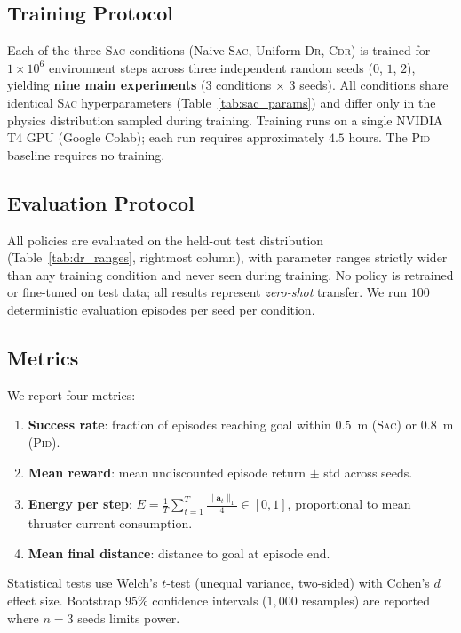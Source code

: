 \documentclass[letterpaper,10pt,journal]{IEEEtran}
\newcommand{\CDR}{\textsc{Cdr}\xspace}
\newcommand{\SAC}{\textsc{Sac}\xspace}
\newcommand{\PID}{\textsc{Pid}\xspace}
\newcommand{\DR}{\textsc{Dr}\xspace}
\begin{document}
\subsection{Training Protocol}

Each of the three \SAC conditions (Naive \SAC, Uniform \DR, \CDR) is
trained for $1\!\times\!10^6$ environment steps across three independent
random seeds ($0$, $1$, $2$), yielding \textbf{nine main experiments}
($3$ conditions $\times$ $3$ seeds).
All conditions share identical \SAC hyperparameters (Table~\ref{tab:sac_params})
and differ only in the physics distribution sampled during training.
Training runs on a single NVIDIA T4 GPU (Google Colab); each run requires
approximately $4.5$ hours.
The \PID baseline requires no training.

\subsection{Evaluation Protocol}

All policies are evaluated on the held-out test distribution
(Table~\ref{tab:dr_ranges}, rightmost column), with parameter ranges
strictly wider than any training condition and never seen during training.
No policy is retrained or fine-tuned on test data; all results represent
\emph{zero-shot} transfer.
We run $100$ deterministic evaluation episodes per seed per condition.

\subsection{Metrics}

We report four metrics:
\begin{enumerate}
  \item \textbf{Success rate}: fraction of episodes reaching goal within
        $0.5$~m (\SAC) or $0.8$~m (\PID).
  \item \textbf{Mean reward}: mean undiscounted episode return
        $\pm$ std across seeds.
  \item \textbf{Energy per step}:
        $E\!=\!\frac{1}{T}\sum_{t=1}^{T}\frac{\|\mathbf{a}_t\|_1}{4}\in[0,1]$,
        proportional to mean thruster current consumption.
  \item \textbf{Mean final distance}: distance to goal at episode end.
\end{enumerate}
Statistical tests use Welch's $t$-test (unequal variance, two-sided)
with Cohen's $d$ effect size.
Bootstrap $95\%$ confidence intervals ($1{,}000$ resamples) are reported
where $n=3$ seeds limits power.
\end{document}
